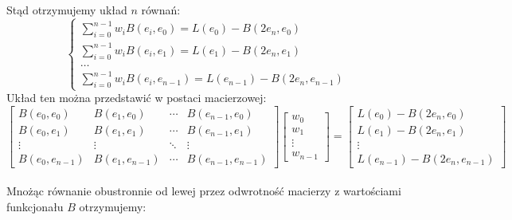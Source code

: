 \documentclass[a4paper,12pt]{article}
\begin{document}
    Stąd otrzymujemy układ \(n\) równań:
    \begin{equation*}
        \begin{cases}
            \sum_{i=0}^{n-1} w_i B\left(e_i, e_0\right) = L\left(e_0\right)-B\left(2e_n, e_0\right) \\
            \sum_{i=0}^{n-1} w_i B\left(e_i, e_1\right) = L\left(e_1\right)-B\left(2e_n, e_1\right) \\
            \ldots \\
            \sum_{i=0}^{n-1} w_i B\left(e_i, e_{n-1}\right) = L\left(e_{n-1}\right)-B\left(2e_n, e_{n-1}\right)
        \end{cases}
    \end{equation*}
    Układ ten można przedstawić w postaci macierzowej:
    {\footnotesize
    \begin{equation*}
        \begin{bmatrix}
            B\left(e_0, e_0\right) & B\left(e_1, e_0\right) & \cdots & B\left(e_{n-1}, e_0\right) \\
            B\left(e_0, e_1\right) & B\left(e_1, e_1\right) & \cdots & B\left(e_{n-1}, e_1\right) \\
            \vdots & \vdots & \ddots & \vdots \\
            B\left(e_0, e_{n-1}\right) & B\left(e_1, e_{n-1}\right) & \cdots & B\left(e_{n-1}, e_{n-1}\right)
        \end{bmatrix}
        \begin{bmatrix}
            w_0 \\
            w_1 \\
            \vdots \\
            w_{n-1}
        \end{bmatrix}
        =
        \begin{bmatrix}
            L\left(e_0\right)-B\left(2e_n, e_0\right) \\
            L\left(e_1\right)-B\left(2e_n, e_1\right) \\
            \vdots \\
            L\left(e_{n-1}\right)-B\left(2e_n, e_{n-1}\right)
        \end{bmatrix}
    \end{equation*}
    }\\
    Mnożąc równanie obustronnie od lewej przez odwrotność macierzy z wartościami funkcjonału \(B\) otrzymujemy:
\end{document}
